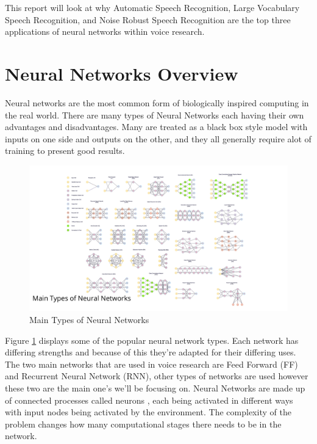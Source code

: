 \documentclass[11pt]{article}
\begin{document}
    This report will look at why Automatic Speech Recognition, Large Vocabulary Speech Recognition, and Noise Robust Speech Recognition are the top three applications of neural networks within voice research.
    
    \section{Neural Networks Overview}
    Neural networks are the most common form of biologically inspired computing in the real world. There are many types of Neural Networks each having their own advantages and disadvantages. Many are treated as a black box style model with inputs on one side and outputs on the other, and they all generally require alot of training to present good results.
    
    \begin{figure}[h]
        \centering
        \includegraphics[scale=0.25]{neuralnetworks.png}
        \caption{Main Types of Neural Networks \cite{MainAI}}
        \label{fig:neuralNetworks}
    \end{figure}
    
    Figure \ref{fig:neuralNetworks} displays some of the popular neural network types. Each network has differing strengths and because of this they're adapted for their differing uses. The two main networks that are used in voice research are Feed Forward (FF) and Recurrent Neural Network (RNN), other types of networks are used however these two are the main one's we'll be focusing on. Neural Networks are made up of connected processes called neurons \cite{Schmidhuber2015DeepOverview}, each being activated in different ways with input nodes being activated by the environment. The complexity of the problem changes how many computational stages there needs to be in the network.
    
\end{document}
